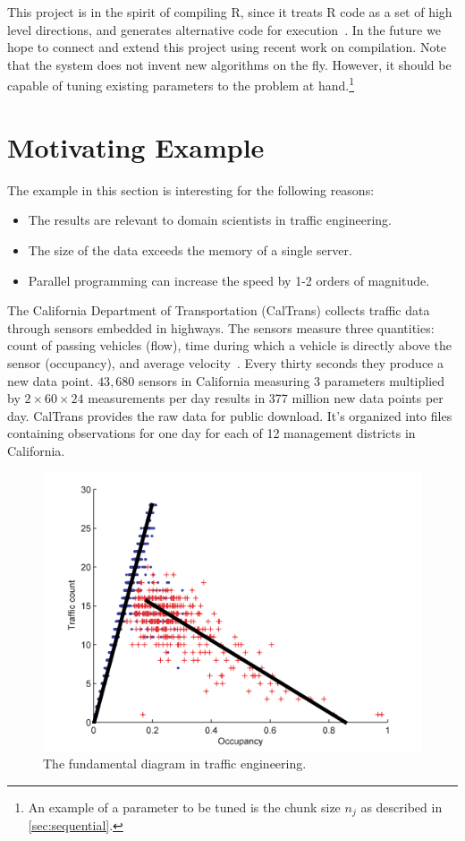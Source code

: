 \documentclass[12pt]{article}
\begin{document}
This project is in the spirit of compiling R, since it treats R code as a
set of high level directions, and generates alternative code for execution~\cite{lang2014enhancing}. In the future we hope to connect and extend this
project using recent work on compilation. Note that the system does not
invent new algorithms on the fly. However, it should be capable of tuning
existing parameters to the problem at hand.\footnote{An example of a
parameter to be tuned is the chunk size $n_j$ as described in
\ref{sec:sequential}.} 

\section{Motivating Example}
\label{sec:pems}

The example in this section is interesting for the following reasons:
\begin{itemize}
    \item The results are relevant to domain scientists in traffic engineering.
    \item The size of the data exceeds the memory of a single server.
    \item Parallel programming can increase the speed by 1-2 orders of
        magnitude.
\end{itemize}

The California Department of Transportation (CalTrans) collects traffic data through
sensors embedded in highways. The sensors measure three quantities: count
of passing vehicles (flow), time during which a vehicle is directly above the
sensor (occupancy), and average velocity~\cite{jia2001pems}.  Every thirty
seconds they produce a new data point. $43,680$ sensors in California
measuring 3 parameters multiplied by $2 \times 60 \times 24$ measurements
per day results in 377 million new data points per day.  CalTrans provides
the raw data for public download. It's organized into files containing
observations for one day for each of 12 management districts in
California.

\begin{figure}
\centering
\includegraphics[width=.7\linewidth]{seminar/fundamental_diagram}
\caption{The fundamental diagram in traffic engineering.}
\label{fig:fundamental_diagram}
\end{figure}
\end{document}

